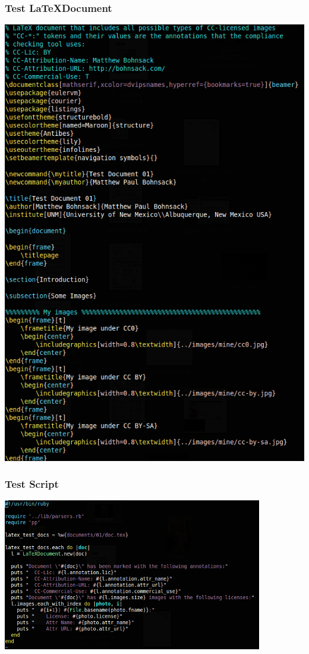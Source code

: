 \documentclass[mathserif,xcolor=dvipsnames,hyperref={bookmarks=true}]{beamer}
\begin{document}
    \begin{frame}[t]
        \frametitle{Test \LaTeX Document}
        \begin{center}
            \includegraphics[height=0.85\textheight]{test-document.png}
        \end{center}
    \end{frame}

    \begin{frame}[t]
        \frametitle{Test Script}
        \begin{center}
            \includegraphics[width=0.85\textwidth]{test.png}
        \end{center}
    \end{frame}
\end{document}
